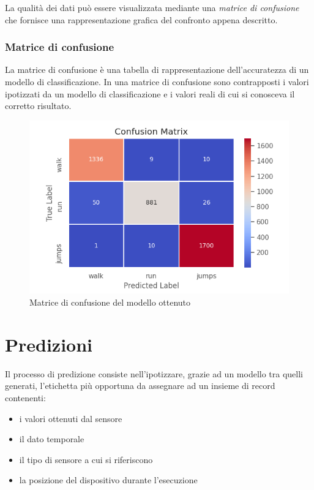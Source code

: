 La qualità dei dati può essere visualizzata mediante una \textit{matrice di confusione} che fornisce una rappresentazione 
grafica del confronto appena descritto.

\subsubsection{Matrice di confusione}
La matrice di confusione è una tabella di rappresentazione dell'accuratezza di un modello di classificazione. 
In una matrice di confusione sono contrapposti i valori ipotizzati da un modello di classificazione e i valori reali 
di cui si conosceva il corretto risultato.

\begin{figure}[H]
    \centering
    \includegraphics[scale = 0.80]{assets/images/classifications/accelerometer/right_hand/confusion-matrix-right-hand-acc.png}
    \caption{Matrice di confusione del modello ottenuto}
\end{figure}


\section{Predizioni}
Il processo di predizione consiste nell'ipotizzare, grazie ad un modello tra quelli generati, 
l'etichetta più opportuna da assegnare ad un insieme di record contenenti:
\begin{itemize}
    \item i valori ottenuti dal sensore
    \item il dato temporale
    \item il tipo di sensore a cui si riferiscono
    \item la posizione del dispositivo durante l'esecuzione
\end{itemize}


